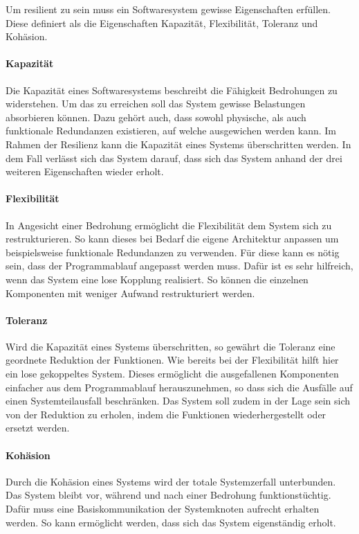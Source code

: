 \documentclass[]{lni}
\begin{document}
Um resilient zu sein muss ein Softwaresystem gewisse Eigenschaften erfüllen.
Diese definiert \cite{ThierryMeyer.2022} als die Eigenschaften Kapazität, Flexibilität, Toleranz und Kohäsion.

\paragraph{Kapazität}
Die Kapazität eines Softwaresystems beschreibt die Fähigkeit Bedrohungen zu widerstehen.
Um das zu erreichen soll das System gewisse Belastungen absorbieren können.
Dazu gehört auch, dass sowohl physische, als auch funktionale Redundanzen existieren, auf welche ausgewichen werden kann.
Im Rahmen der Resilienz kann die Kapazität eines Systems überschritten werden.
In dem Fall verlässt sich das System darauf, dass sich das System anhand der drei weiteren Eigenschaften wieder erholt.

\paragraph{Flexibilität}
In Angesicht einer Bedrohung ermöglicht die Flexibilität dem System sich zu restrukturieren.
So kann dieses bei Bedarf die eigene Architektur anpassen um beispielsweise funktionale Redundanzen zu verwenden.
Für diese kann es nötig sein, dass der Programmablauf angepasst werden muss.
Dafür ist es sehr hilfreich, wenn das System eine lose Kopplung realisiert.
So können die einzelnen Komponenten mit weniger Aufwand restrukturiert werden.

\paragraph{Toleranz}
Wird die Kapazität eines Systems überschritten, so gewährt die Toleranz eine geordnete Reduktion der Funktionen.
Wie bereits bei der Flexibilität hilft hier ein lose gekoppeltes System.
Dieses ermöglicht die ausgefallenen Komponenten einfacher aus dem Programmablauf herauszunehmen, so dass sich die Ausfälle auf einen Systemteilausfall beschränken.
Das System soll zudem in der Lage sein sich von der Reduktion zu erholen, indem die Funktionen wiederhergestellt oder ersetzt werden.

\paragraph{Kohäsion}
Durch die Kohäsion eines Systems wird der totale Systemzerfall unterbunden.
Das System bleibt vor, während und nach einer Bedrohung funktionstüchtig.
Dafür muss eine Basiskommunikation der Systemknoten aufrecht erhalten werden.
So kann ermöglicht werden, dass sich das System eigenständig erholt.
\end{document}
